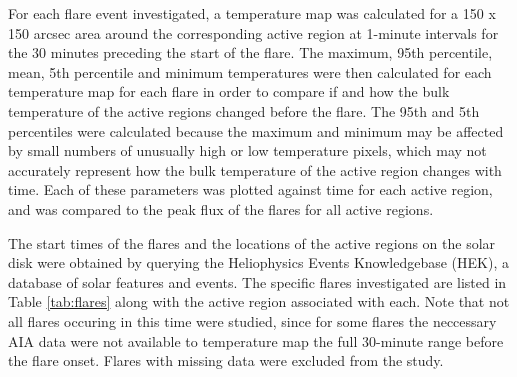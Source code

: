 \documentclass[referee,a4paper,12pt]{swsc}
\begin{document}
\begin{linenumbers}
For each flare event investigated, a temperature map was calculated for a 150 x 150 arcsec area around the corresponding active region at 1-minute intervals for the 30 minutes preceding the start of the flare. %
The maximum, 95th percentile, mean, 5th percentile and minimum temperatures were then calculated for each temperature map for each flare in order to compare if and how the bulk temperature of the active regions changed before the flare.
The 95th and 5th percentiles were calculated because the maximum and minimum may be affected by small numbers of unusually high or low temperature pixels, which may not accurately represent how the bulk temperature of the active region changes with time. %
Each of these parameters was plotted against time for each active region, and was compared to the peak flux of the flares for all active regions.

The start times of the flares and the locations of the active regions on the solar disk were obtained by querying the Heliophysics Events Knowledgebase (HEK), a database of solar features and events. %
The specific flares investigated are listed in Table \ref{tab:flares} along with the active region associated with each.
Note that not all flares occuring in this time were studied, since for some flares the neccessary AIA data were not available to temperature map the full 30-minute range before the flare onset.
Flares with missing data were excluded from the study.


\end{linenumbers}
\end{document}
